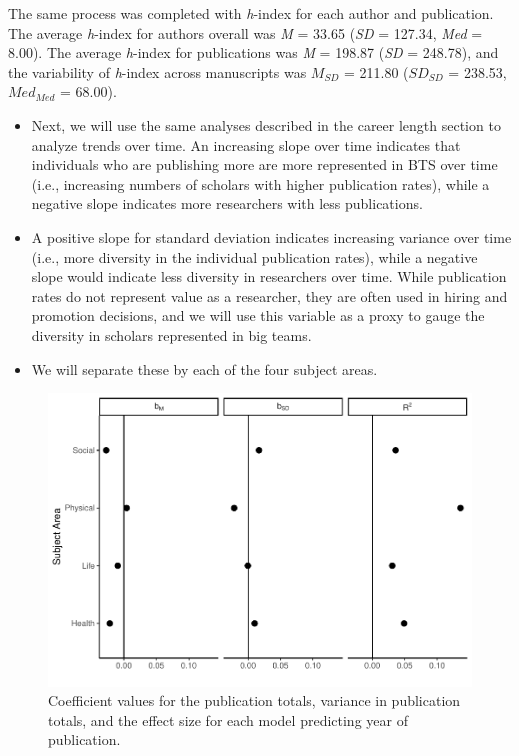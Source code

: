 \documentclass[
  man]{apa7}
\providecommand{\tightlist}{%
  \setlength{\itemsep}{0pt}\setlength{\parskip}{0pt}}
\begin{document}
The same process was completed with \emph{h}-index for each author and
publication. The average \emph{h}-index for authors overall was \emph{M} =
33.65 (\emph{SD} = 127.34, \emph{Med} = 8.00). The
average \emph{h}-index for publications was \emph{M} = 198.87 (\emph{SD}
= 248.78), and the variability of \emph{h}-index across
manuscripts was \(M_{SD}\) = 211.80 (\(SD_{SD}\) =
238.53, \(Med_{Med}\) = 68.00).

\begin{itemize}
\tightlist
\item
  Next, we will use the same analyses described in the career length
  section to analyze trends over time. An increasing slope over time
  indicates that individuals who are publishing more are more
  represented in BTS over time (i.e., increasing numbers of scholars
  with higher publication rates), while a negative slope indicates
  more researchers with less publications.
\item
  A positive slope for standard deviation indicates increasing
  variance over time (i.e., more diversity in the individual
  publication rates), while a negative slope would indicate less
  diversity in researchers over time. While publication rates do not
  represent value as a researcher, they are often used in hiring and
  promotion decisions, and we will use this variable as a proxy to
  gauge the diversity in scholars represented in big teams.
\item
  We will separate these by each of the four subject areas.
\end{itemize}

\begin{figure}
\centering
\includegraphics{manuscript_scopus_files/figure-latex/fig-pub-results-1.pdf}
\caption{\label{fig:fig-pub-results}Coefficient values for the publication totals, variance in publication totals, and the effect size for each model predicting year of publication.}
\end{figure}
\end{document}
